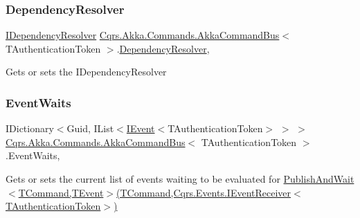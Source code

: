 \subsubsection{\texorpdfstring{Dependency\+Resolver}{DependencyResolver}}
{\footnotesize\ttfamily \hyperlink{interfaceCqrs_1_1Configuration_1_1IDependencyResolver}{I\+Dependency\+Resolver} \hyperlink{classCqrs_1_1Akka_1_1Commands_1_1AkkaCommandBus}{Cqrs.\+Akka.\+Commands.\+Akka\+Command\+Bus}$<$ T\+Authentication\+Token $>$.\hyperlink{classCqrs_1_1Configuration_1_1DependencyResolver}{Dependency\+Resolver}\hspace{0.3cm}{\ttfamily [get]}, {\ttfamily [protected]}}



Gets or sets the I\+Dependency\+Resolver 

\mbox{\label{classCqrs_1_1Akka_1_1Commands_1_1AkkaCommandBus_af64744500f25a0b203684ef757aa7962_af64744500f25a0b203684ef757aa7962}} 
\subsubsection{\texorpdfstring{Event\+Waits}{EventWaits}}
{\footnotesize\ttfamily I\+Dictionary$<$Guid, I\+List$<$\hyperlink{interfaceCqrs_1_1Events_1_1IEvent}{I\+Event}$<$T\+Authentication\+Token$>$ $>$ $>$ \hyperlink{classCqrs_1_1Akka_1_1Commands_1_1AkkaCommandBus}{Cqrs.\+Akka.\+Commands.\+Akka\+Command\+Bus}$<$ T\+Authentication\+Token $>$.Event\+Waits\hspace{0.3cm}{\ttfamily [get]}, {\ttfamily [protected]}}



Gets or sets the current list of events waiting to be evaluated for \hyperlink{classCqrs_1_1Akka_1_1Commands_1_1AkkaCommandBus_a8e1291f0259ac80e393c02bb119159a5_a8e1291f0259ac80e393c02bb119159a5}{Publish\+And\+Wait$<$\+T\+Command,\+T\+Event$>$(\+T\+Command,\+Cqrs.\+Events.\+I\+Event\+Receiver$<$\+T\+Authentication\+Token$>$)} 

\mbox{\label{classCqrs_1_1Akka_1_1Commands_1_1AkkaCommandBus_a218e431067a4cadbdd711d74cbe8e53b_a218e431067a4cadbdd711d74cbe8e53b}} 
